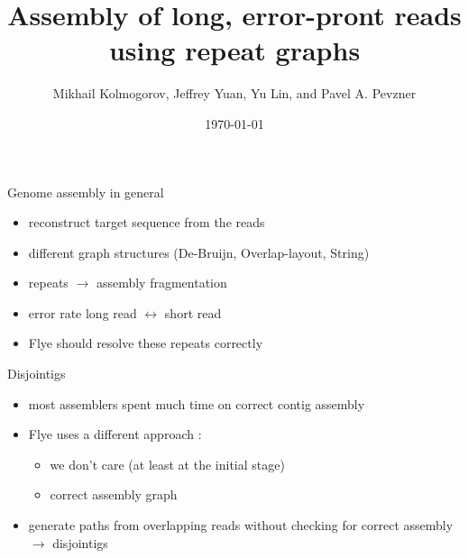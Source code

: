 \documentclass{beamer}
\title{Assembly of long, error-pront reads using repeat graphs}
\date{\today}
\author{Mikhail Kolmogorov, Jeffrey Yuan, Yu Lin, and Pavel A. Pevzner}
\institute{Johannes Hausmann, Luis Kress}
\begin{document}
  \maketitle
  
  
  \begin{frame}{Genome assembly in general}
    \begin{itemize}[<+- | alert@+>]
      \item reconstruct target sequence from the reads

      \item different graph structures (De-Bruijn, Overlap-layout, String)

      \item repeats $\rightarrow$ assembly fragmentation

      \item error rate long read $\leftrightarrow$ short read

      \item Flye should resolve these repeats correctly
    \end{itemize}
  \end{frame}


  \begin{frame}{Disjointigs}
    \begin{itemize}[<+- | alert@+>]
      \item most assemblers spent much time on correct contig assembly

      \item Flye uses a different approach \cite{kolmogorov_assembly_2019}:
      
      \begin{itemize}[<+- | alert@+>]
        \item we don't care (at least at the initial stage)
        
        \item correct assembly graph 
      \end{itemize}

      \item generate paths from overlapping reads without checking for correct assembly $\rightarrow$ disjointigs
    \end{itemize}
  \end{frame}
\end{document}

